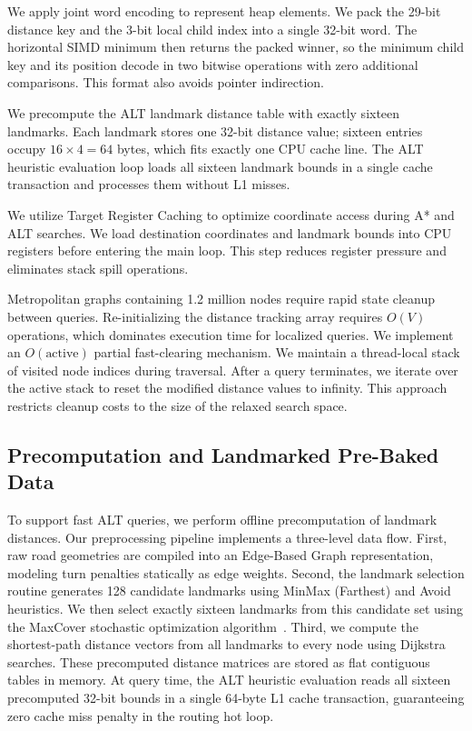 We apply joint word encoding to represent heap elements. 
We pack the 29-bit distance key and the 3-bit local child index into a single 32-bit word. 
The horizontal SIMD minimum then returns the packed winner, so the minimum child key and its position decode in two bitwise operations with zero additional comparisons. 
This format also avoids pointer indirection. 

We precompute the ALT landmark distance table with exactly sixteen landmarks. 
Each landmark stores one 32-bit distance value; sixteen entries occupy $16 \times 4 = 64$ bytes, which fits exactly one CPU cache line. 
The ALT heuristic evaluation loop loads all sixteen landmark bounds in a single cache transaction and processes them without L1 misses. 

We utilize Target Register Caching to optimize coordinate access during A* and ALT searches. 
We load destination coordinates and landmark bounds into CPU registers before entering the main loop. 
This step reduces register pressure and eliminates stack spill operations. 

Metropolitan graphs containing 1.2 million nodes require rapid state cleanup between queries. 
Re-initializing the distance tracking array requires $O(V)$ operations, which dominates execution time for localized queries. 
We implement an $O(\text{active})$ partial fast-clearing mechanism. 
We maintain a thread-local stack of visited node indices during traversal. 
After a query terminates, we iterate over the active stack to reset the modified distance values to infinity. 
This approach restricts cleanup costs to the size of the relaxed search space.


\subsection{Precomputation and Landmarked Pre-Baked Data}
To support fast ALT queries, we perform offline precomputation of landmark distances. Our preprocessing pipeline implements a three-level data flow. First, raw road geometries are compiled into an Edge-Based Graph representation, modeling turn penalties statically as edge weights. Second, the landmark selection routine generates 128 candidate landmarks using MinMax (Farthest) and Avoid heuristics. We then select exactly sixteen landmarks from this candidate set using the MaxCover stochastic optimization algorithm~\cite{fuchs2010preprocessing}.
Third, we compute the shortest-path distance vectors from all landmarks to every node using Dijkstra searches. These precomputed distance matrices are stored as flat contiguous tables in memory. At query time, the ALT heuristic evaluation reads all sixteen precomputed 32-bit bounds in a single 64-byte L1 cache transaction, guaranteeing zero cache miss penalty in the routing hot loop.
